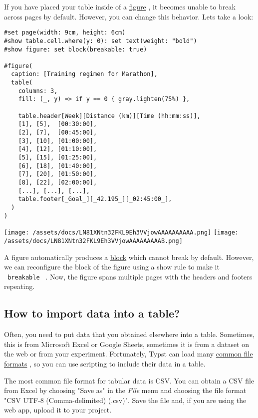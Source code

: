 If you have placed your table inside of a
\href{/docs/reference/model/figure/}{figure} , it becomes unable to
break across pages by default. However, you can change this behavior.
Let\textquotesingle s take a look:

\begin{verbatim}
#set page(width: 9cm, height: 6cm)
#show table.cell.where(y: 0): set text(weight: "bold")
#show figure: set block(breakable: true)

#figure(
  caption: [Training regimen for Marathon],
  table(
    columns: 3,
    fill: (_, y) => if y == 0 { gray.lighten(75%) },

    table.header[Week][Distance (km)][Time (hh:mm:ss)],
    [1], [5],  [00:30:00],
    [2], [7],  [00:45:00],
    [3], [10], [01:00:00],
    [4], [12], [01:10:00],
    [5], [15], [01:25:00],
    [6], [18], [01:40:00],
    [7], [20], [01:50:00],
    [8], [22], [02:00:00],
    [...], [...], [...],
    table.footer[_Goal_][_42.195_][_02:45:00_],
  )
)
\end{verbatim}

\texttt{[image: /assets/docs/LN81XNtn32FKL9Eh3VVjowAAAAAAAAAA.png]}
\texttt{[image: /assets/docs/LN81XNtn32FKL9Eh3VVjowAAAAAAAAAB.png]}

A figure automatically produces a
\href{/docs/reference/layout/block/}{block} which cannot break by
default. However, we can reconfigure the block of the figure using a
show rule to make it \texttt{\ breakable\ } . Now, the figure spans
multiple pages with the headers and footers repeating.

\subsection{How to import data into a table?}\label{importing-data}

Often, you need to put data that you obtained elsewhere into a table.
Sometimes, this is from Microsoft Excel or Google Sheets, sometimes it
is from a dataset on the web or from your experiment. Fortunately, Typst
can load many \href{/docs/reference/data-loading/}{common file formats}
, so you can use scripting to include their data in a table.

The most common file format for tabular data is CSV. You can obtain a
CSV file from Excel by choosing "Save as" in the \emph{File} menu and
choosing the file format "CSV UTF-8 (Comma-delimited) (.csv)". Save the
file and, if you are using the web app, upload it to your project.

